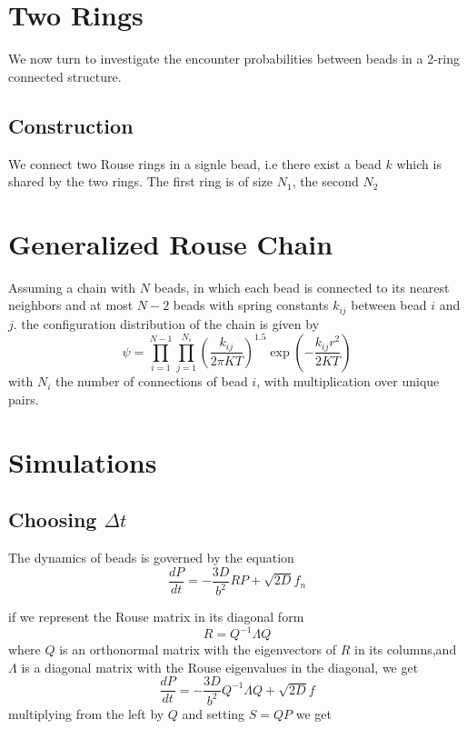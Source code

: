 \documentclass{report}
\begin{document}
\section{Two Rings}\label{section_twoRings}
We now turn to investigate the encounter probabilities between beads in a 2-ring connected structure. 
\subsection{Construction}\label{subsection_twoRingsConstruction}
We connect two Rouse rings in a signle bead, i.e there exist a bead $k$ which is shared by the two rings. The first ring is of size $N_1$, the second $N_2$
 

 
\section{Generalized Rouse Chain}\label{section_generalizedRouseChain}
Assuming a chain with $N$ beads, in which each bead is connected to its nearest neighbors and at most $N-2$ beads with spring constants $k_{ij}$ between bead $i$ and $j$. the configuration distribution of the chain is given by 
\begin{equation*}
\psi = \prod_{i=1}^{N-1}\prod_{j=1}^{N_i}\left(\frac{k_{ij}}{2\pi KT}\right)^{1.5}\exp\left(-\frac{k_{ij}r^2}{2KT}\right)
\end{equation*}
with $N_i$ the number of connections of bead $i$, with multiplication over unique pairs. 

\section{Simulations}
\subsection{Choosing $\Delta t$}
The dynamics of beads is governed by the equation
\begin{equation*}
\frac{dP}{dt} = -\frac{3D}{b^2}RP+\sqrt{2D}f_n
 \end{equation*}

if we represent the Rouse matrix in its diagonal form 
\begin{equation*}
R=Q^{-1}\Lambda Q
\end{equation*}
where $Q$ is an orthonormal matrix with the eigenvectors of $R$ in its columns,and $\Lambda$ is a diagonal matrix with the Rouse eigenvalues in the diagonal, we get 
\begin{equation*}
\frac{dP}{dt} = -\frac{3D}{b^2}Q^{-1}\Lambda Q+\sqrt{2D}f
\end{equation*}
multiplying from the left by $Q$ and setting $S=QP$ we get 
\end{document}
